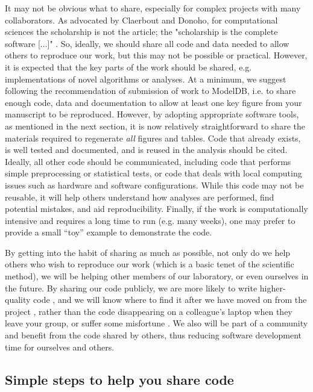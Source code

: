 \documentclass[11pt]{article}
\begin{document}
It may not be obvious what to share, especially for complex projects
with many collaborators.  As advocated by Claerbout and Donoho, for
computational sciences the scholarship is not the article; the
"scholarship is the complete software [...]"
\cite{claerbout_electronic_1992,donoho_invitation_2010}.  So, ideally,
we should share all code and data needed to allow others to
reproduce our work, but this may not be possible or practical.
However, it is expected that the key parts of the work should be shared,
e.g. implementations of novel algorithms or analyses.  At a minimum,
we suggest following the recommendation of submission of work to
ModelDB\cite{modeldb}, i.e. to share enough code, data and
documentation to allow at least one key figure from your manuscript to
be reproduced.  However, by adopting appropriate software tools, as
mentioned in the next section, it is now relatively straightforward to
share the materials required to regenerate \textit{all} figures and
tables.  Code that already exists, is well tested and documented, and is reused 
in the analysis should be cited. Ideally, all other code should be 
communicated, including code that performs simple
preprocessing or statistical tests, or code that deals with local
computing issues such as hardware and software configurations. 
While this code may not be reusable, it will help others understand how
analyses are performed, find potential mistakes, and aid reproducibility. 
Finally, if the work is computationally intensive and requires a long
time to run (e.g. many weeks), one may prefer to provide a small ``toy''
example to demonstrate the code.

By getting into the habit of sharing as much as possible, not only do
we help others who wish to reproduce our work (which is a basic tenet
of the scientific method), we will be helping other members of our
laboratory, or even ourselves in the future.  By sharing our code
publicly, we are more likely to write higher-quality code
\cite{Easterbrook2014}, and we will know where to find it after we
have moved on from the project \cite{Halchenko2015}, rather than the
code disappearing on a colleague's laptop when they leave your group,
or suffer some misfortune \cite{Berg2016}.  We also will be part of a
community and benefit from the code shared by others, thus reducing
software development time for ourselves and others.

\subsection*{Simple steps to help you share code}
\end{document}
